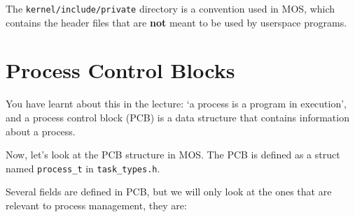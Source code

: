 \begin{note}
    \item The \texttt{kernel/include/private} directory is a convention used in MOS, which
    contains the header files that are \textbf{not} meant to be used by userspace programs.
\end{note}

\section{Process Control Blocks}

You have learnt about this in the lecture: `a process is a program in execution', and a process
control block (PCB) is a data structure that contains information about a process.

Now, let's look at the PCB structure in MOS. The PCB is defined as a struct named \texttt{process\_t}
in \texttt{task\_types.h}.

Several fields are defined in PCB, but we will only look at the ones that are relevant to
process management, they are:


